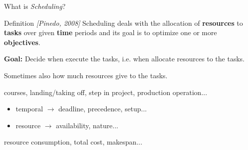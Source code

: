 \begin{frame}{What is {\it Scheduling}?}
  \vspace{0.3cm}
  \begin{block}{Definition {\small \it \color{blue!50!black!50}[Pinedo, 2008]}}
    Scheduling deals with the allocation of {\bf resources} to {\bf tasks} over
    given \textbf{time} periods and its goal is to optimize one or more \textbf{objectives}.
  \end{block}
\pause
  \vspace{0.3cm}
  {\bf Goal:} Decide when execute the tasks, i.e. when allocate resources
  to the tasks.
\pause
\vspace{0.3cm}

  Sometimes also how much resources give to the tasks.
  \vspace{0.5cm}
 {\small  \begin{description}[constraints :]
    \pause
  \item[tasks :]  courses, landing/taking off, step in project,
    production operation... 
    \pause
  \item[constraints :]
    \begin{itemize}
    \item temporal $\rightarrow$ deadline, precedence, setup...
    \item resource $\rightarrow$ availability, nature... 
    \end{itemize}
    \pause
  \item[objective :] resource consumption, total cost, makespan...
  \end{description}}
\vfill
\end{frame}


